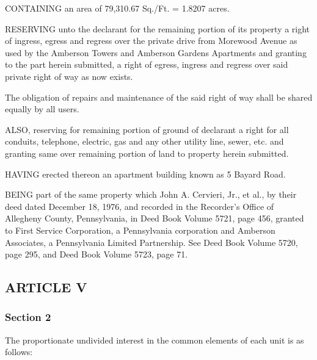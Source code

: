 \documentclass[]{tufte-handout}
\begin{document}
CONTAINING an area of 79,310.67 Sq./Ft. = 1.8207 acres.

RESERVING unto the declarant for the remaining portion of its property a
right of ingress, egress and regress over the private drive from
Morewood Avenue as used by the Amberson Towers and Amberson Gardens
Apartments and granting to the part herein submitted, a right of egress,
ingress and regress over said private right of way as now exists.

The obligation of repairs and maintenance of the said right of way shall
be shared equally by all users.

ALSO, reserving for remaining portion of ground of declarant a right for
all conduits, telephone, electric, gas and any other utility line,
sewer, etc. and granting same over remaining portion of land to property
herein submitted.

HAVING erected thereon an apartment building known as 5 Bayard Road.

BEING part of the same property which John A. Cervieri, Jr., et al., by
their deed dated December 18, 1976, and recorded in the Recorder's
Office of Allegheny County, Pennsylvania, in Deed Book Volume 5721, page
456, granted to First Service Corporation, a Pennsylvania corporation
and Amberson Associates, a Pennsylvania Limited Partnership. See Deed
Book Volume 5720, page 295, and Deed Book Volume 5723, page 71.

\hypertarget{article-v}{%
\subsection*{ARTICLE V}\label{article-v}}

\hypertarget{section-2}{%
\subsubsection*{Section 2}\label{section-2}}

The proportionate undivided interest in the common elements of each unit
is as follows:
\end{document}

